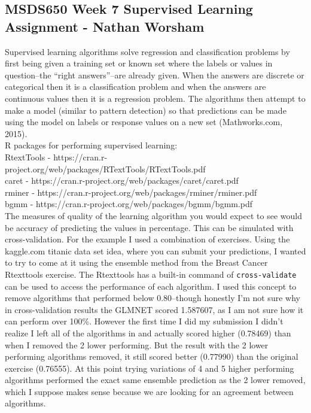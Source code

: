 \documentclass[10pt]{article}
\begin{document}
\subsection*{MSDS650 Week 7 Supervised Learning Assignment - Nathan Worsham}
Supervised learning algorithms solve regression and classification problems by first being given a training set or known set where the labels or values in question--the “right answers”--are already given. When the answers are discrete or categorical then it is a classification problem and when the answers are continuous values then it is a regression problem. The algorithms then attempt to make a model (similar to pattern detection) so that predictions can be made using the model on labels or response values on a new set (Mathworks.com, 2015).\\
R packages for performing supervised learning:\\
RtextTools - https://cran.r-project.org/web/packages/RTextTools/RTextTools.pdf\\
caret -  https://cran.r-project.org/web/packages/caret/caret.pdf\\
rminer - https://cran.r-project.org/web/packages/rminer/rminer.pdf\\
bgmm - https://cran.r-project.org/web/packages/bgmm/bgmm.pdf\\
The measures of quality of the learning algorithm you would expect to see would be accuracy of predicting the values in percentage. This can be simulated with cross-validation. For the example I used a combination of exercises. Using the kaggle.com titanic data set idea, where you can submit your predictions, I wanted to try to come at it using the ensemble method from the Breast Cancer Rtexttools exercise. The Rtexttools has a built-in command of \verb|cross-validate| can be used to access the performance of each algorithm. I used this concept to remove algorithms that performed below 0.80--though honestly I'm not sure why in cross-validation results the GLMNET scored 1.587607, as I am not sure how it can perform over 100\%. However the first time I did my submission I didn’t realize I left all of the algorithms in and actually scored higher (0.78469) than when I removed the 2 lower performing. But the result with the 2 lower performing algorithms removed, it still scored better (0.77990) than the original exercise (0.76555). At this point trying variations of 4 and 5 higher performing algorithms performed the exact same ensemble prediction as the 2 lower removed, which I suppose makes sense because we are looking for an agreement between algorithms.
\end{document}
